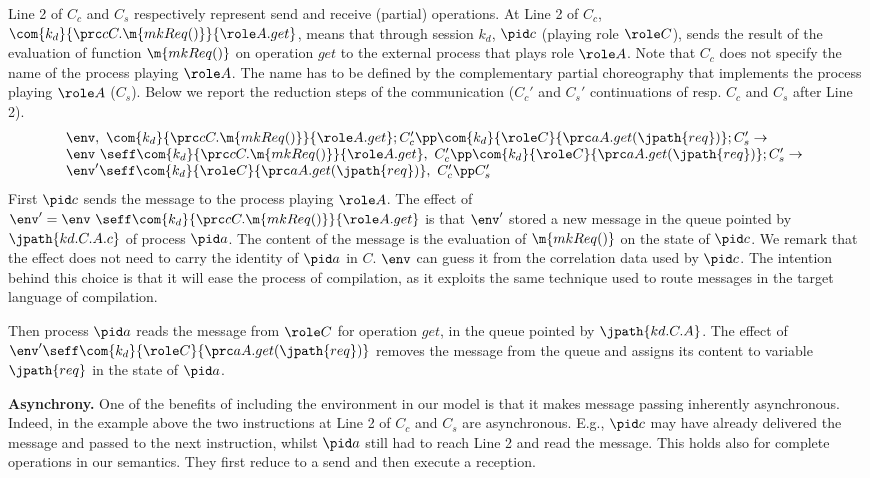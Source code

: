 Line 2 of $C_c$ and $C_s$ respectively represent send and receive (partial)
operations. At Line 2 of $C_c$, $\com{k_d}{\prc cC.\m{mkReq()}}{\role A.get}$,
means that through session $k_d$, $\pid c$ (playing role $\role C$), sends the
result of the evaluation of function $\m{mkReq()}$ on operation $get$ to the
external process that plays role $\role A$. Note that $C_c$ does not specify
the name of the process playing $\role A$. The name has to be defined by the
complementary partial choreography that implements the process playing
$\role A$ ($C_s$). Below we report the reduction steps of the communication
($C_c'$ and $C_s'$ continuations of resp. $C_c$ and $C_s$ after Line 2).
{\scriptsize
$$
\hspace{-.5em}\begin{array}{l}
	\env,\ \com{k_d}{\prc cC.\m{mkReq()}}{\role A.get};C_c' \pp
			 \com{k_d}{\role C}{\prc aA.get(\jpath{req})};C_s'
	\to
	\\
	\env\ \seff \com{k_d}{\prc cC.\m{mkReq()}}{\role A.get},\ C_c' \pp
			 \com{k_d}{\role C}{\prc aA.get(\jpath{req})};C_s'
	\to
	\\
	\env' \seff \com{k_d}{\role C}{\prc aA.get(\jpath{req})},\ C_c' \pp C_s'
\end{array}
$$
}
First $\pid c$ sends the message to the process playing $\role A$. The effect
of $\env' = \env\ \seff \com{k_d}{\prc cC.\m{mkReq()}}{\role A.get}$ is that
$\env'$ stored a new message in the queue pointed by $\jpath {kd.C.A.c}$ of
process $\pid a$. The content of the message is the evaluation of $\m{mkReq
()}$ on the state of $\pid c$. We remark that the effect does not need to
carry the identity of $\pid a$ in $C$. $\env$ can guess it from the
correlation data used by $\pid c$. The intention behind this choice is that
it will ease the process of compilation, as it exploits the same technique
used to route messages in the target language of compilation.

Then process $\pid a$ reads the message from $\role C$ for operation $get$,
in the queue pointed by $\jpath {kd.C.A}$. The effect of $\env' \seff
\com{k_d}{\role C}{\prc aA.get(\jpath{req})}$ removes the message from the
queue and assigns its content to variable $\jpath{req}$ in the state of $\pid
a$.

\textbf{Asynchrony.}
One of the benefits of including the environment in our model is that it
makes message passing inherently asynchronous. Indeed, in the example above
the two instructions at Line 2 of $C_c$ and $C_s$ are asynchronous. E.g.,
$\pid c$ may have already delivered the message and passed to the next
instruction, whilst $\pid a$ still had to reach Line 2 and read the message.
This holds also for complete operations in our semantics. They first reduce
to a send and then execute a reception.

